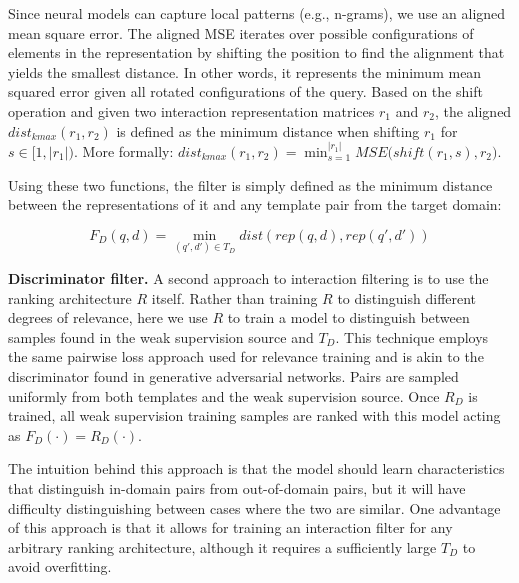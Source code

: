 Since neural models can capture local patterns (e.g., n-grams), we use an aligned mean square error. The aligned MSE iterates over possible configurations of elements in the representation by shifting the position to find the alignment that yields the smallest distance. In other words, it represents the minimum mean squared error given all rotated configurations of the query.
Based on the shift operation and given two interaction representation matrices $r_1$ and $r_2$,
the aligned $\mathit{dist}_{kmax}(r_1,r_2)$ is defined as 
the minimum distance when shifting $r_1$ for $s\in [1, |r_1|)$.
More formally: $\mathit{dist}_{kmax}(r_1,r_2) = \min_{s=1}^{|r_1|}{\mathit{MSE}\big(\mathit{shift}(r_1, s),r_2\big)}$.

Using these two functions, the filter is simply defined as the minimum distance between the representations of it and any template pair from the target domain:

\vspace{-1.2em}\begin{equation}\label{eq.dist.drmm}
F_D(q,d)=\min_{(q',d')\in T_D}dist(rep(q,d),rep(q',d'))
\end{equation}\vspace{-0.8em}

\textbf{Discriminator filter.}
A second approach to interaction filtering is to use the ranking architecture $R$ itself. Rather than training $R$ to distinguish different degrees of relevance, here we use $R$ to train a model to distinguish between samples found in the weak supervision source and $T_D$. This technique employs the same pairwise loss approach used for relevance training and is akin to the discriminator found in generative adversarial networks. Pairs are sampled uniformly from both templates and the weak supervision source. Once $R_D$ is trained, all weak supervision training samples are ranked with this model acting as $F_D(\cdot)=R_D(\cdot)$.

The intuition behind this approach is that the model should learn characteristics that distinguish in-domain pairs from out-of-domain pairs, but it will have difficulty distinguishing between cases where the two are similar. One advantage of this approach is that it allows for training an interaction filter for any arbitrary ranking architecture, although it requires a sufficiently large $T_D$ to avoid overfitting.
















